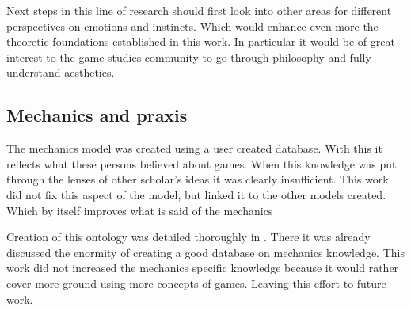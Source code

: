 Next steps in this line of research should first look into other areas for different perspectives on emotions and instincts. Which would enhance even more the theoretic foundations established in this work. In particular it would be of great interest to the game studies community to go through philosophy and fully understand aesthetics.

\subsection{Mechanics and praxis}

The mechanics model was created using a user created database. With this it reflects what these persons believed about games. When this knowledge was put through the lenses of other scholar's ideas it was clearly insufficient. This work did not fix this aspect of the model, but linked it to the other models created. Which by itself improves what is said of the mechanics

Creation of this ontology was detailed thoroughly in \cite{kritz_buildingOntology}. There it was already discussed the enormity of creating a good database on mechanics knowledge. This work did not increased the mechanics specific knowledge because it would rather cover more ground using more concepts of games. Leaving this effort to future work.

